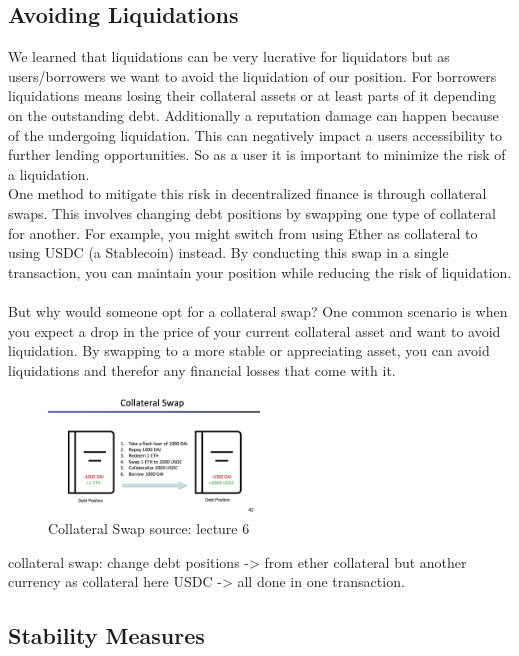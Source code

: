 \documentclass{article}
\begin{document}
\subsection{Avoiding Liquidations}%
We learned that liquidations can be very lucrative for liquidators but as users/borrowers we want to avoid the liquidation of our position. For borrowers liquidations means losing their collateral assets or at least parts of it depending on the outstanding debt. Additionally a reputation damage can happen because of the undergoing liquidation. This can negatively impact a users accessibility to further lending opportunities. So as a user it is important to minimize the risk of a liquidation.\\
One method to mitigate this risk in decentralized finance is through collateral swaps. This involves changing debt positions by swapping one type of collateral for another. For example, you might switch from using Ether as collateral to using USDC (a Stablecoin) instead. By conducting this swap in a single transaction, you can maintain your position while reducing the risk of liquidation.\\\\But why would someone opt for a collateral swap? One common scenario is when you expect a drop in the price of your current collateral asset and want to avoid liquidation. By swapping to a more stable or appreciating asset, you can avoid liquidations and therefor any financial losses that come with it.\\
\begin{figure}[h]
    \centering
    \includegraphics[width=0.5\textwidth]{Bildschirmfoto 2024-04-07 um 17.48.13.png} 
    \caption{Collateral Swap \scriptsize{source: lecture 6}}
    \label{fig:DoS-attack}
\end{figure}
collateral swap:
change debt positions -> from ether collateral but another currency as collateral here USDC -> all done in one transaction.


\subsection{Stability Measures}%
\end{document}
